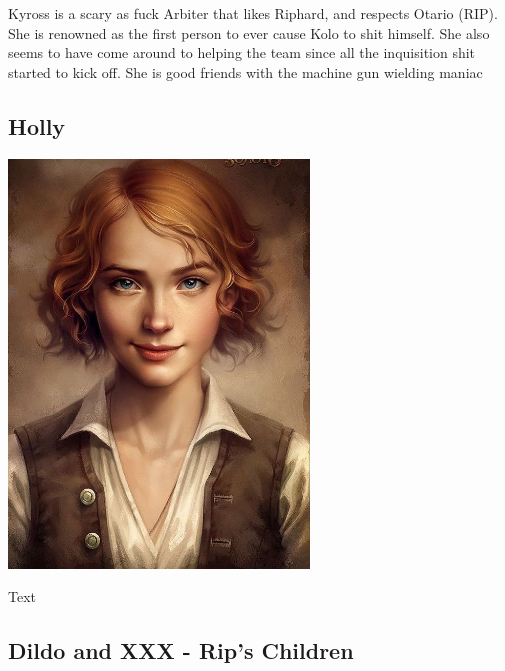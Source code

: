\noindent 

Kyross is a scary as fuck Arbiter that likes Riphard, and respects Otario (RIP). She is renowned as the first person to ever cause Kolo to shit himself. She also seems to have come around to helping the team since all the inquisition shit started to kick off. She is good friends with the machine gun wielding maniac

\smallskip

\subsection*{Holly} 

\begin{center}
\includegraphics[width=80mm]{./content/img/holly.jpg}
\begin{figure}[h]
\end{figure}
\end{center}

\noindent 

Text

\smallskip

\subsection*{Dildo and XXX - Rip's Children} 

